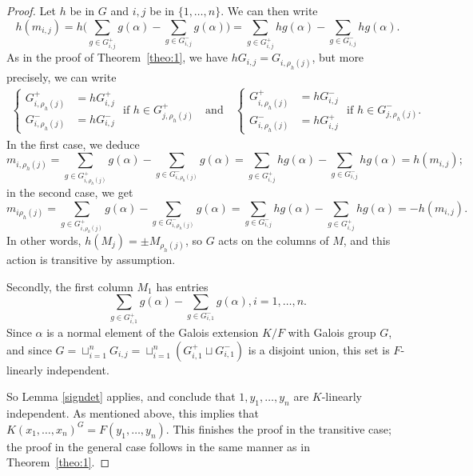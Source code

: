\documentclass[12pt]{article}
\theoremstyle{plain}
\begin{document}
\begin{proof}
Let $h$ be in $G$
and  $i,j$ be in $\lbrace 1, \ldots, n \rbrace$. We 
can then write
$$h(m_{i,j}) = h\Big( \sum_{g\in G^{+}_{i,j}}g(\alpha) -\sum_{g\in
  G^{-}_{i,j}}g(\alpha)\Big) = \sum_{g\in G^{+}_{i,j}}hg(\alpha)
-\sum_{g\in G^{-}_{i,j}}hg(\alpha).$$ 
As in the proof of Theorem~\ref{theo:1}, we have
$hG_{i,j} = G_{i,\rho_h(j)}$, but more precisely, we can write
\begin{align}
\left \{
\begin{array}{ll}
  G^{+}_{i,\rho_{h}(j)}&= hG^{+}_{i,j}\\
G^{-}_{i,\rho_h(j)}&= hG^{-}_{i,j}
\end{array}\right .
\text{~if~} h \in G^+_{j,\rho_h(j)}
\quad\text{and}\quad
\left \{
\begin{array}{cl}
  G^{+}_{i,\rho_{h}(j)}&= hG^{-}_{i,j}\\
G^{-}_{i,\rho_h(j)}&= hG^{+}_{i,j}
\end{array}\right .
\text{~if~} h \in G^-_{j,\rho_h(j)}.
\end{align}
In the first case, we deduce
$$m_{i,\rho_h(j)} =  \sum_{g\in G^{+}_{i,\rho_h(j)}}g(\alpha) -\sum_{g\in G^{-}_{i,\rho_h(j)}}g(\alpha) 
                  =  \sum_{g\in G^{+}_{i,j}}hg(\alpha) -\sum_{g\in G^{-}_{i,j}}hg(\alpha)
=h(m_{i,j});$$
in the second case, we get
$$m_{i\rho_h(j)} = \sum_{g\in G^{+}_{i,\rho_h(j)}}g(\alpha)
-\sum_{g\in G^{-}_{i,\rho_h(j)}}g(\alpha) = \sum_{g\in
  G^{-}_{i,j}}hg(\alpha) -\sum_{g\in
  G^{+}_{i,j}}hg(\alpha)=-h(m_{i,j}).$$ In other words, $h(M_j) = \pm
M_{\rho_h(j)}$, so $G$ acts on the columns of $M$, and this action is
transitive by assumption.

Secondly, the first column $M_1$ has entries 
$$\sum_{g \in G^{+}_{i,1}}g(\alpha)- \sum_{g \in
  G^{-}_{i,1}}g(\alpha), i = 1, \ldots,n.$$ Since $\alpha$ is a normal
element of the Galois extension $K/F$ with Galois group $G$, and since
$G = \sqcup^n_{i =1}G_{i,j}= \sqcup^n_{i =1}(G^{+}_{i,1} \sqcup
G^{-}_{i,1}) $ is a disjoint union, this set is $F$-linearly
independent.

So Lemma \ref{signdet} applies, and conclude that $1, y_1, \ldots,
y_n$ are $K$-linearly independent. As mentioned above, this implies
that $K(x_1,\dots,x_n)^G=F(y_1,\dots,y_n)$.  This finishes the proof
in the transitive case; the proof in the general case follows in the
same manner as in Theorem~\ref{theo:1}.
\end{proof}
\end{document}
